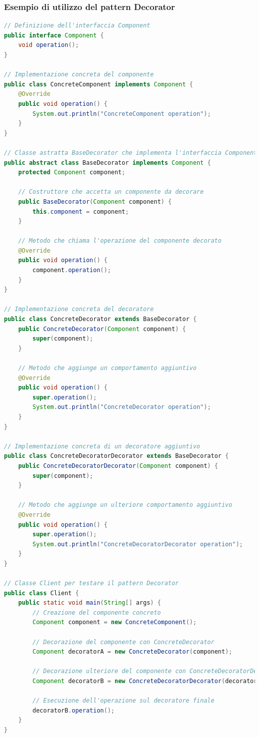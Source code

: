 \documentclass[11pt]{article}
\begin{document}
\subsubsection{Esempio di utilizzo del pattern Decorator}
\begin{lstlisting}[language=Java]
// Definizione dell'interfaccia Component
public interface Component {
    void operation();
}

// Implementazione concreta del componente
public class ConcreteComponent implements Component {
    @Override
    public void operation() {
        System.out.println("ConcreteComponent operation");
    }
}

// Classe astratta BaseDecorator che implementa l'interfaccia Component
public abstract class BaseDecorator implements Component {
    protected Component component;

    // Costruttore che accetta un componente da decorare
    public BaseDecorator(Component component) {
        this.component = component;
    }

    // Metodo che chiama l'operazione del componente decorato
    @Override
    public void operation() {
        component.operation();
    }
}

// Implementazione concreta del decoratore
public class ConcreteDecorator extends BaseDecorator {
    public ConcreteDecorator(Component component) {
        super(component);
    }

    // Metodo che aggiunge un comportamento aggiuntivo
    @Override
    public void operation() {
        super.operation();
        System.out.println("ConcreteDecorator operation");
    }
}

// Implementazione concreta di un decoratore aggiuntivo
public class ConcreteDecoratorDecorator extends BaseDecorator {
    public ConcreteDecoratorDecorator(Component component) {
        super(component);
    }

    // Metodo che aggiunge un ulteriore comportamento aggiuntivo
    @Override
    public void operation() {
        super.operation();
        System.out.println("ConcreteDecoratorDecorator operation");
    }
}

// Classe Client per testare il pattern Decorator
public class Client {
    public static void main(String[] args) {
        // Creazione del componente concreto
        Component component = new ConcreteComponent();

        // Decorazione del componente con ConcreteDecorator
        Component decoratorA = new ConcreteDecorator(component);

        // Decorazione ulteriore del componente con ConcreteDecoratorDecorator
        Component decoratorB = new ConcreteDecoratorDecorator(decoratorA);

        // Esecuzione dell'operazione sul decoratore finale
        decoratorB.operation();
    }
}
\end{lstlisting}
\end{document}
